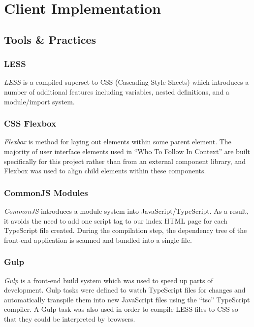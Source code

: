 \documentclass{l4proj}
\begin{document}
                       
                          
\section{Client Implementation}
        \subsection{Tools \& Practices}
           
        \subsubsection{LESS}
        \textit{LESS} is a compiled superset to CSS (Cascading Style Sheets) which introduces a number of additional features including variables, nested definitions, and a module/import system.
        
        \subsubsection{CSS Flexbox}
        \textit{Flexbox} is method for laying out elements within some parent element. The majority of user interface elements used in ``Who To Follow In Context'' are built specifically for this project rather than from an external component library, and Flexbox was used to align child elements within these components.

        \subsubsection{CommonJS Modules}
        \textit{CommonJS} introduces a module system into JavaScript/TypeScript. As a result, it avoids the need to add one script tag to our index HTML page for each TypeScript file created. During the compilation step, the dependency tree of the front-end application is scanned and bundled into a single file.

        \subsubsection{Gulp}
        \textit{Gulp} is a front-end build system which was used to speed up parts of development. Gulp tasks were defined to watch TypeScript files for changes and automatically transpile them into new JavaScript files using the ``tsc'' TypeScript compiler. A Gulp task was also used in order to compile LESS files to CSS so that they could be interpreted by browsers.
        
\end{document}
